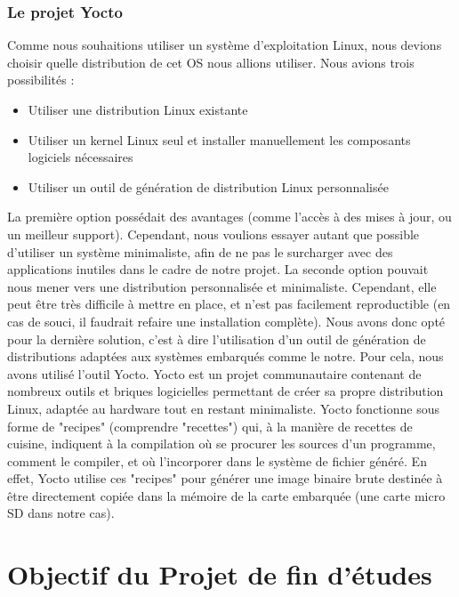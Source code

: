 \documentclass{report}
\begin{document}
     \subsubsection{Le projet Yocto}
     {Comme nous souhaitions utiliser un système d'exploitation Linux, nous devions
     choisir quelle distribution de cet OS nous allions utiliser. Nous avions trois
     possibilités :}
     \begin{itemize}
       \item Utiliser une distribution Linux existante
       \item Utiliser un kernel Linux seul et installer manuellement les composants logiciels nécessaires
       \item Utiliser un outil de génération de distribution Linux personnalisée
     \end{itemize}

     La première option possédait des avantages (comme l'accès à des mises à jour, ou
     un meilleur support). Cependant, nous voulions essayer autant que possible d'utiliser
     un système minimaliste, afin de ne pas le surcharger avec des applications
     inutiles dans le cadre de notre projet. La seconde option pouvait nous mener
     vers une distribution personnalisée et minimaliste. Cependant, elle peut être
     très difficile à mettre en place, et n'est pas facilement reproductible (en cas
     de souci, il faudrait refaire une installation complète). Nous avons donc opté
     pour la dernière solution, c'est à dire l'utilisation d'un outil de génération de
     distributions adaptées aux systèmes embarqués comme le notre. Pour cela, nous avons
     utilisé l'outil Yocto.
     \newline
     Yocto est un projet communautaire contenant de nombreux outils et briques
     logicielles permettant de créer sa propre distribution Linux, adaptée
     au hardware tout en restant minimaliste. Yocto fonctionne sous forme de
     "recipes" (comprendre "recettes") qui, à la manière de recettes de
     cuisine, indiquent à la compilation où se procurer les sources d'un programme,
     comment le compiler, et où l'incorporer dans le système de fichier généré.
     En effet, Yocto utilise ces "recipes" pour générer une image binaire brute
     destinée à être directement copiée dans la mémoire de la carte embarquée (une
     carte micro SD dans notre cas).

    \section{Objectif du Projet de fin d'études}
\end{document}
